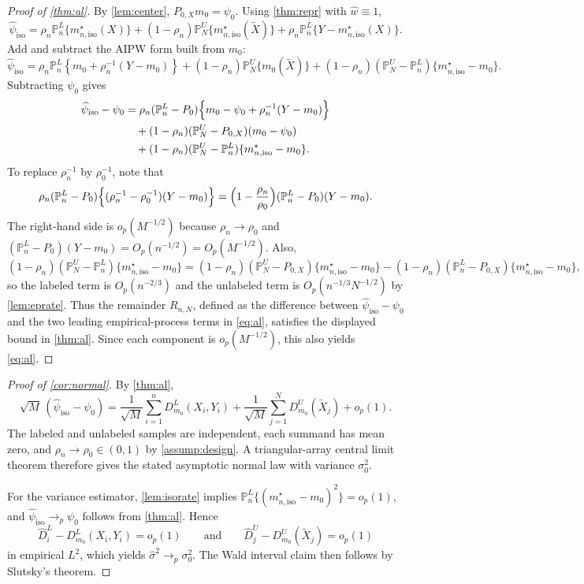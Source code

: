 \documentclass{article}
\theoremstyle{plain}
\theoremstyle{definition}
\newcommand{\1}{\mathbbm{1}}
\newcommand{\what}{\widehat w}
\newcommand{\rhozero}{\rho_0}
\newcommand{\rhon}{\rho_n}
\newcommand{\Pl}{\mathbb{P}^{L}_n}
\newcommand{\Pu}{\mathbb{P}^{U}_N}
\newcommand{\Px}{P_{0,X}}
\begin{document}
\begin{proof}[Proof of \cref{thm:al}]
By \cref{lem:center}, \(\Px m_0=\psi_0\). Using \cref{thm:repr} with \(\what \equiv 1\),
\[
\widehat{\psi}_{\mathrm{iso}}
=
\rhon \Pl\{m_{n,\mathrm{iso}}^\star(X)\}+(1-\rhon)\Pu\{m_{n,\mathrm{iso}}^\star(\widetilde X)\}+\rhon \Pl\{Y-m_{n,\mathrm{iso}}^\star(X)\}.
\]
Add and subtract the AIPW form built from \(m_0\):
\[
\widehat{\psi}_{\mathrm{iso}}
=
\rhon \Pl\left\{m_0+\rhon^{-1}(Y-m_0)\right\}
+
(1-\rhon)\Pu\{m_0(\widetilde X)\}
+
(1-\rhon)(\Pu-\Pl)\{m_{n,\mathrm{iso}}^\star-m_0\}.
\]
Subtracting \(\psi_0\) gives
\[
\begin{aligned}
\widehat{\psi}_{\mathrm{iso}}-\psi_0
&=
\rhon(\Pl-P_0)\Bigl\{m_0-\psi_0+\rhon^{-1}(Y-m_0)\Bigr\}\\
&\quad +
(1-\rhon)(\Pu-\Px)(m_0-\psi_0)\\
&\quad +
(1-\rhon)(\Pu-\Pl)\{m_{n,\mathrm{iso}}^\star-m_0\}.
\end{aligned}
\]
To replace \(\rhon^{-1}\) by \(\rhozero^{-1}\), note that
\[
\rhon(\Pl-P_0)\Bigl\{(\rhon^{-1}-\rhozero^{-1})(Y-m_0)\Bigr\}
=
\Bigl(1-\frac{\rhon}{\rhozero}\Bigr)(\Pl-P_0)(Y-m_0).
\]
The right-hand side is \(o_p(M^{-1/2})\) because \(\rhon\to\rhozero\) and \((\Pl-P_0)(Y-m_0)=O_p(n^{-1/2})=O_p(M^{-1/2})\). Also,
\[
(1-\rhon)(\Pu-\Pl)\{m_{n,\mathrm{iso}}^\star-m_0\}
=(1-\rhon)(\Pu-\Px)\{m_{n,\mathrm{iso}}^\star-m_0\}-(1-\rhon)(\Pl-\Px)\{m_{n,\mathrm{iso}}^\star-m_0\},
\]
so the labeled term is \(O_p(n^{-2/3})\) and the unlabeled term is \(O_p(n^{-1/3}N^{-1/2})\) by \cref{lem:eprate}. Thus the remainder \(R_{n,N}\), defined as the difference between \(\widehat{\psi}_{\mathrm{iso}}-\psi_0\) and the two leading empirical-process terms in \cref{eq:al}, satisfies the displayed bound in \cref{thm:al}. Since each component is \(o_p(M^{-1/2})\), this also yields \cref{eq:al}.
\end{proof}

\begin{proof}[Proof of \cref{cor:normal}]
By \cref{thm:al},
\[
\sqrt{M}\,(\widehat{\psi}_{\mathrm{iso}}-\psi_0)
=
\frac{1}{\sqrt{M}}\sum_{i=1}^n D_{m_0}^L(X_i,Y_i)
+
\frac{1}{\sqrt{M}}\sum_{j=1}^N D_{m_0}^U(\widetilde X_j)
+
o_p(1).
\]
The labeled and unlabeled samples are independent, each summand has mean zero, and \(\rhon\to\rhozero\in(0,1)\) by \cref{assump:design}. A triangular-array central limit theorem therefore gives the stated asymptotic normal law with variance \(\sigma_0^2\).

For the variance estimator, \cref{lem:isorate} implies \(\Pl\{(m_{n,\mathrm{iso}}^\star-m_0)^2\}=o_p(1)\), and \(\widehat{\psi}_{\mathrm{iso}}\to_p\psi_0\) follows from \cref{thm:al}. Hence
\[
\widehat D_i^L-D_{m_0}^L(X_i,Y_i)=o_p(1)
\qquad\text{and}\qquad
\widehat D_j^U-D_{m_0}^U(\widetilde X_j)=o_p(1)
\]
in empirical \(L^2\), which yields \(\widehat\sigma^2\to_p \sigma_0^2\). The Wald interval claim then follows by Slutsky's theorem.
\end{proof}
\end{document}
